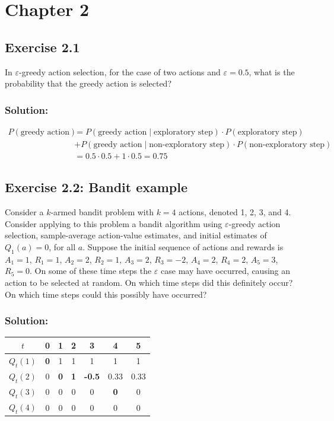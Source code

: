 \section*{Chapter 2}

\subsection*{Exercise 2.1} 
In $\varepsilon$-greedy action selection, for the case of two actions and $\varepsilon = 0.5$, what is
the probability that the greedy action is selected? 

\subsubsection*{Solution:}
\footnotesize{
    \begin{align*}
        P(\text{greedy action}) &= P(\text{greedy action} \mid \text{exploratory step}) \cdot P(\text{exploratory step}) \\
        &+ P(\text{greedy action} \mid \text{non-exploratory step}) \cdot P(\text{non-exploratory step}) \\
        &= 0.5 \cdot 0.5 + 1 \cdot 0.5 = 0.75
    \end{align*}
}
    
    
    


\subsection*{Exercise 2.2: Bandit example} 
Consider a $k$-armed bandit problem with $k = 4$ actions,
denoted 1, 2, 3, and 4. Consider applying to this problem a bandit algorithm using
$\varepsilon$-greedy action selection, sample-average action-value estimates, and initial estimates
of $Q_1(a) = 0$, for all $a$. Suppose the initial sequence of actions and rewards is $A_1 = 1$,
$R_1 = 1$, $A_2 = 2$, $R_2 = 1$, $A_3 = 2$, $R_3 = -2$, $A_4 = 2$, $R_4 = 2$, $A_5 = 3$, $R_5 = 0$. On some
of these time steps the $\varepsilon$ case may have occurred, causing an action to be selected at
random. On which time steps did this definitely occur? On which time steps could this
possibly have occurred?

\subsubsection*{Solution:}


\begin{center}
    \begin{tabular}{|c|c|c|c|c|c|c|}
    \hline
        $t$  & 0 & 1 & 2 & 3  & 4   & 5   \\ \hline 
    $Q_t(1)$ & \textbf{0}  & 1  & 1  & 1   & 1    & 1    \\ 
    $Q_t(2)$ & 0  & \textbf{0}  & \textbf{1}  & \textbf{-0.5} & 0.33 & 0.33 \\ 
    $Q_t(3)$ & 0  & 0  & 0  & 0   & \textbf{0}    & 0    \\ 
    $Q_t(4)$ & 0  & 0  & 0  & 0   & 0    & 0    \\ \hline
    \end{tabular}
\end{center}


